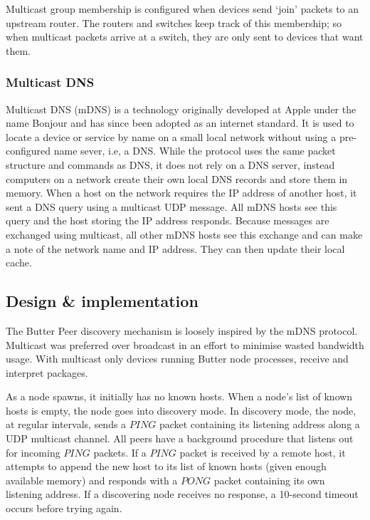 Multicast group membership is configured when devices send `join' packets to an upstream router. The routers and switches keep track of this membership; so when multicast packets arrive at a switch, they are only sent to devices that want them.

\subsubsection{Multicast DNS}

Multicast DNS (mDNS) is a technology originally developed at Apple under the name Bonjour and has since been adopted as an internet standard\cite{cheshire2013mdns}. It is used to locate a device or service by name on a small local network without using a pre-configured name sever, i.e, a DNS. While the protocol uses the same packet structure and commands as DNS, it does not rely on a DNS server, instead computers on a network create their own local DNS records and store them in memory. When a host on the network requires the IP address of another host, it sent a DNS query using a multicast UDP message. All mDNS hosts see this query and the host storing the IP address responds. Because messages are exchanged using multicast, all other mDNS hosts see this exchange and can make a note of the network name and IP address. They can then update their local cache.

\subsection{Design \& implementation}

The Butter Peer discovery mechanism is loosely inspired by the mDNS protocol. Multicast was preferred over broadcast in an effort to minimise wasted bandwidth usage. With multicast only devices running Butter node processes, receive and interpret packages.

As a node spawns, it initially has no known hosts. When a node's list of known hosts is empty, the node goes into discovery mode. In discovery mode, the node, at regular intervals, sends a $PING$ packet containing its listening address along a UDP multicast channel. All peers have a background procedure that listens out for incoming $PING$ packets. If a $PING$ packet is received by a remote host, it attempts to append the new host to its list of known hosts (given enough available memory) and responds with a $PONG$ packet containing its own listening address. If a discovering node receives no response, a 10-second timeout occurs before trying again.

